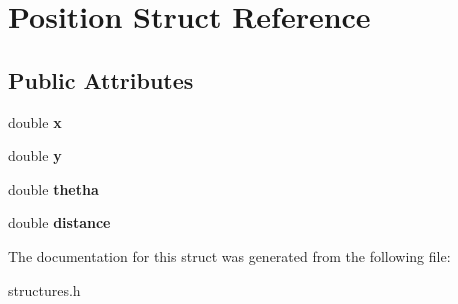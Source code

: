 \hypertarget{struct_position}{}\section{Position Struct Reference}
\label{struct_position}
\subsection*{Public Attributes}
\begin{DoxyCompactItemize}
\item 
double {\bfseries x}\hypertarget{struct_position_a9abbe738bad177de91fe4774099c1260}{}\label{struct_position_a9abbe738bad177de91fe4774099c1260}

\item 
double {\bfseries y}\hypertarget{struct_position_a75f48c2a1d2c7131b8be1a0687ae72c8}{}\label{struct_position_a75f48c2a1d2c7131b8be1a0687ae72c8}

\item 
double {\bfseries thetha}\hypertarget{struct_position_a575782e58b84c940b73b4b13d79bc90b}{}\label{struct_position_a575782e58b84c940b73b4b13d79bc90b}

\item 
double {\bfseries distance}\hypertarget{struct_position_a5f42dba8245012ff325521a88ff7a892}{}\label{struct_position_a5f42dba8245012ff325521a88ff7a892}

\end{DoxyCompactItemize}


The documentation for this struct was generated from the following file\+:\begin{DoxyCompactItemize}
\item 
structures.\+h\end{DoxyCompactItemize}
